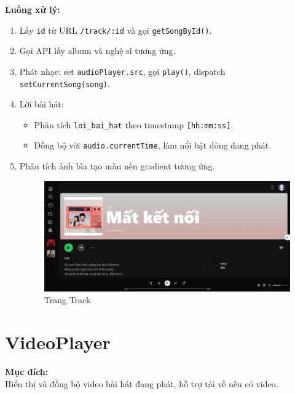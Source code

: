 \textbf{Luồng xử lý:}
\begin{enumerate}
  \item Lấy \texttt{id} từ URL \texttt{/track/:id} và gọi \texttt{getSongById()}.
  \item Gọi API lấy album và nghệ sĩ tương ứng.
  \item Phát nhạc: set \texttt{audioPlayer.src}, gọi \texttt{play()}, dispatch \texttt{setCurrentSong(song)}.
  \item Lời bài hát:
  \begin{itemize}
    \item Phân tích \texttt{loi\_bai\_hat} theo timestamp \texttt{[hh:mm:ss]}.
    \item Đồng bộ với \texttt{audio.currentTime}, làm nổi bật dòng đang phát.
  \end{itemize}
  \item Phân tích ảnh bìa tạo màu nền gradient tương ứng.
  \begin{figure}[H]
    \centering
    \includegraphics[width=1\textwidth]{imgs/trienkhaife/track.png}
    \caption{Trang Track}
  \end{figure}
\end{enumerate}

\section{VideoPlayer}

\textbf{Mục đích:} \\
Hiển thị và đồng bộ video bài hát đang phát, hỗ trợ tải về nếu có video.

